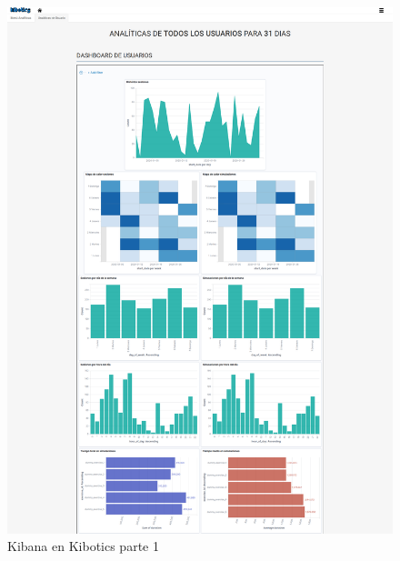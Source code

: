 \documentclass[a4paper, 12pt]{book}
\begin{document}
		\begin{figure}[H]
			\centering
			\includegraphics[width=15cm, keepaspectratio]{img/kibana_kibotics_01.png}
			\caption{Kibana en Kibotics parte 1}
			\label{fig:kibana_kibotics_01}
		\end{figure}
\end{document}
